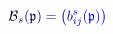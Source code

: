 \documentclass[12pt]{article}
\begin{document}
\makeatletter
\renewcommand*{\@textcolor}[3]{%
  \protect\leavevmode
  \begingroup
    \color#1{#2}#3%
  \endgroup
}
\makeatother
\begin{displaymath}
\mathcal { \mathcolor[RGB]{0,0,15}{B} } _ { \mathcolor[RGB]{0,0,30}{s} } \mathcolor[RGB]{0,0,45}{(} \mathfrak { \mathcolor[RGB]{0,0,60}{p} } \mathcolor[RGB]{0,0,75}{)} \mathcolor[RGB]{0,0,90}{=} \mathcolor[RGB]{0,0,105}{\left(} \mathcolor[RGB]{0,0,120}{b} _ { \mathcolor[RGB]{0,0,135}{i} \mathcolor[RGB]{0,0,150}{j} } ^ { \mathcolor[RGB]{0,0,165}{s} } \mathcolor[RGB]{0,0,180}{(} \mathfrak { \mathcolor[RGB]{0,0,195}{p} } \mathcolor[RGB]{0,0,210}{)} \mathcolor[RGB]{0,0,225}{\right)}
\end{displaymath}
\end{document}
